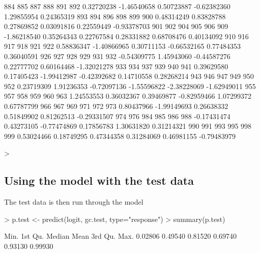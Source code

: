 \documentclass{article}
\begin{document}
\begin{Schunk}
\begin{Soutput}
        884         885         887         888         891         892 
 0.32720238 -1.46540658  0.50723887 -0.62382360  1.29855954  0.24365319 
        893         894         896         898         899         900 
 0.48314249  0.83828788  0.27869852  0.03091816  0.22559449 -0.93378703 
        901         902         904         905         906         909 
-1.86218540  0.35264343  0.22767584  0.28331882  0.68708476  0.40134092 
        910         916         917         918         921         922 
 0.58836347 -1.40866965  0.30711153 -0.66532165  0.77484353  0.36040591 
        926         927         928         929         931         932 
-0.54309775  1.45943060 -0.44587276  0.22777702  0.60164468 -1.32021278 
        933         934         937         939         940         941 
 0.39629580  0.17405423 -1.99412987 -0.42392682  0.14710558  0.28268214 
        943         946         947         949         950         952 
 0.23719309  1.91236353 -0.72097136 -1.55596822 -2.38228069 -1.62949011 
        955         957         958         959         960         963 
 1.24553553  0.36032367  0.39469877 -0.82959466  1.07299372  0.67787799 
        966         967         969         971         972         973 
 0.80437966 -1.99149693  0.26638332  0.51849902  0.81262513 -0.29331507 
        974         976         984         985         986         988 
-0.17431474  0.43273105 -0.77474869  0.17856783  1.30631820  0.31214321 
        990         991         993         995         998         999 
 0.53024466  0.18749295  0.47344358  0.31284069  0.46981155 -0.79483979 
\end{Soutput}
\begin{Sinput}
> 
\end{Sinput}
\end{Schunk}

\subsection*{Using the model with the test data}
The test data is then run through the model
\begin{Schunk}
\begin{Sinput}
> p.test <- predict(logit, gc.test, type="response")
> summary(p.test)
\end{Sinput}
\begin{Soutput}
   Min. 1st Qu.  Median    Mean 3rd Qu.    Max. 
0.02806 0.49540 0.81520 0.69740 0.93130 0.99930 
\end{Soutput}
\end{Schunk}
\end{document}
